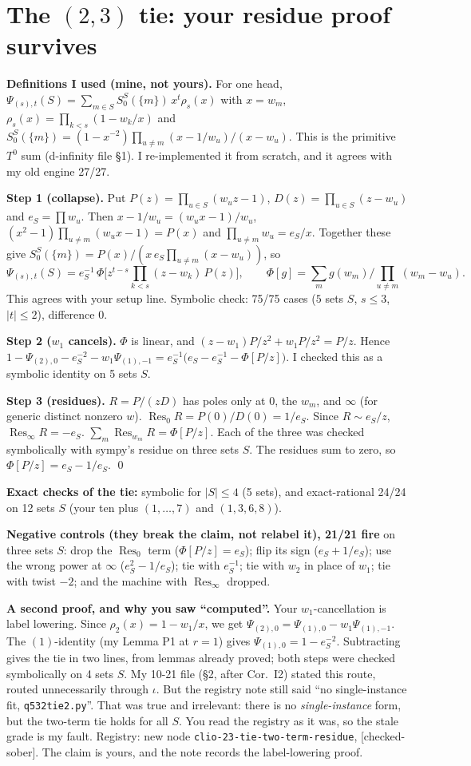 \documentclass[10pt]{article}
\newcommand{\grade}[1]{\textsf{[#1]}}
\newcommand{\Res}{\operatorname*{Res}}
\begin{document}
\section{The $(2,3)$ tie: your residue proof survives}
\textbf{Definitions I used (mine, not yours).} For one head, $\Psi_{(s),t}(S)=\sum_{m\in S}S_0^S(\{m\})\,x^t\rho_s(x)$ with
$x=w_m$, $\rho_s(x)=\prod_{k<s}(1-w_k/x)$ and $S_0^S(\{m\})=(1-x^{-2})\prod_{u\ne m}(x-1/w_u)/(x-w_u)$. This is the primitive
$T^0$ sum (d-infinity file \S1). I re-implemented it from scratch, and it agrees with my old engine 27/27.

\textbf{Step 1 (collapse).} Put $P(z)=\prod_{u\in S}(w_uz-1)$, $D(z)=\prod_{u\in S}(z-w_u)$ and $e_S=\prod w_u$. Then
$x-1/w_u=(w_ux-1)/w_u$, $(x^2-1)\prod_{u\ne m}(w_ux-1)=P(x)$ and $\prod_{u\ne m}w_u=e_S/x$. Together these give
$S_0^S(\{m\})=P(x)/(x\,e_S\prod_{u\ne m}(x-w_u))$, so
\[\Psi_{(s),t}(S)=e_S^{-1}\,\Phi\bigl[z^{t-s}\textstyle\prod_{k<s}(z-w_k)\,P(z)\bigr],\qquad
\Phi[g]=\sum_m g(w_m)/\prod_{u\ne m}(w_m-w_u).\]
This agrees with your setup line. Symbolic check: 75/75 cases ($5$ sets $S$, $s\le3$, $|t|\le2$), difference $0$.

\textbf{Step 2 ($w_1$ cancels).} $\Phi$ is linear, and $(z-w_1)P/z^2+w_1P/z^2=P/z$. Hence
$1-\Psi_{(2),0}-e_S^{-2}-w_1\Psi_{(1),-1}=e_S^{-1}\bigl(e_S-e_S^{-1}-\Phi[P/z]\bigr)$. I checked this as a symbolic identity on 5 sets $S$.

\textbf{Step 3 (residues).} $R=P/(zD)$ has poles only at $0$, the $w_m$, and $\infty$ (for generic distinct nonzero $w$).
$\Res_0R=P(0)/D(0)=1/e_S$. Since $R\sim e_S/z$, $\Res_\infty R=-e_S$. $\sum_m\Res_{w_m}R=\Phi[P/z]$. Each of the three was
checked symbolically with sympy's residue on three sets $S$. The residues sum to zero, so $\Phi[P/z]=e_S-1/e_S$. \qed

\textbf{Exact checks of the tie:} symbolic for $|S|\le4$ (5 sets), and exact-rational 24/24 on 12 sets $S$ (your ten plus
$(1,\dots,7)$ and $(1,3,6,8)$).

\textbf{Negative controls (they break the claim, not relabel it), 21/21 fire} on three sets $S$:
drop the $\Res_0$ term ($\Phi[P/z]=e_S$); flip its sign ($e_S+1/e_S$); use the wrong power at $\infty$ ($e_S^2-1/e_S$); tie with
$e_S^{-1}$; tie with $w_2$ in place of $w_1$; tie with twist $-2$; and the machine with $\Res_\infty$ dropped.

\textbf{A second proof, and why you saw ``computed''.} Your $w_1$-cancellation is label lowering. Since
$\rho_2(x)=1-w_1/x$, we get $\Psi_{(2),0}=\Psi_{(1),0}-w_1\Psi_{(1),-1}$. The $(1)$-identity (my Lemma P1 at $r=1$) gives
$\Psi_{(1),0}=1-e_S^{-2}$. Subtracting gives the tie in two lines, from lemmas already proved; both steps were checked
symbolically on 4 sets $S$. My 10-21 file (\S2, after Cor.~I2) stated this route, routed unnecessarily through $\iota$.
But the registry note still said ``no single-instance fit, \texttt{q532tie2.py}''. That was true and irrelevant: there is no
\emph{single-instance} form, but the two-term tie holds for all $S$. You read the registry as it was, so the stale grade
is my fault. Registry: new node \texttt{clio-23-tie-two-term-residue}, \grade{checked-sober}. The claim is yours, and the note
records the label-lowering proof.
\end{document}
